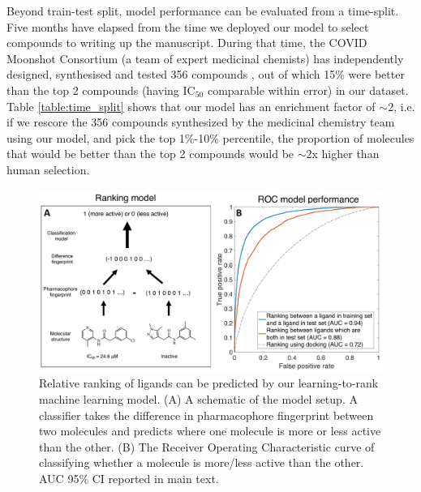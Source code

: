 Beyond train-test split, model performance can be evaluated from a time-split. Five months have elapsed from the time we deployed our model to select compounds to writing up the manuscript. During that time, the COVID Moonshot Consortium (a team of expert medicinal chemists) has independently designed, synthesised and tested 356 compounds \cite{moonshot2020covid}, out of which 15\% were better than the top 2 compounds (having $\mathrm{IC}_{50}$ comparable within error) in our dataset. Table \ref{table:time_split} shows that our model has an enrichment factor of $\sim$2, i.e. if we rescore the 356 compounds synthesized by the medicinal chemistry team using our model, and pick the top 1\%-10\% percentile, the proportion of molecules that would be better than the top 2 compounds would be $\sim$2x higher than human selection. 


\begin{figure}
\centering
    \includegraphics[scale=0.28]{Chapters/Ranking/Figs/ranking-model.pdf}
    \caption{Relative ranking of ligands can be predicted by our learning-to-rank machine learning model. (A) A schematic of the model setup. A classifier takes the difference in pharmacophore fingerprint between two molecules and predicts where one molecule is more or less active than the other. (B) The Receiver Operating Characteristic curve of classifying whether a molecule is more/less active than the other. AUC 95\% CI reported in main text.}
    \label{fig:roc_plot}
\end{figure}

